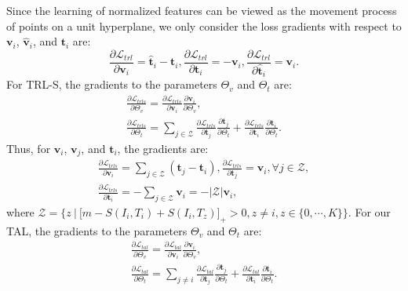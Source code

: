 \documentclass[10pt,twocolumn,letterpaper]{article}
\begin{document}
Since the learning of normalized features can be viewed as the movement process of points on a unit hyperplane, we only consider the loss gradients with respect to $\boldsymbol{v}_i$, $\hat{\boldsymbol{v}}_i$, and $\boldsymbol{t }_i$ are:
\begin{equation}                              
     \frac{\partial \mathcal{L}_{trl}}{\partial\boldsymbol{v}_i} = \hat{\boldsymbol{t}}_i-\boldsymbol{t}_i,  \frac{\partial \mathcal{L}_{trl}}{\partial{\boldsymbol{t}}_i} = - \boldsymbol{v}_i,  \frac{\partial \mathcal{L}_{trl}}{\partial\hat{\boldsymbol{t}}_i} = \boldsymbol{v}_i.
\label{eq_g_trl} 
\end{equation}
For TRL-S, the gradients to the parameters $\Theta_v$ and $\Theta_t$ are:
\begin{equation}
    \begin{gathered}
        \frac{\partial\mathcal{L}_{trls}}{\partial\Theta_v}=\frac{\partial\mathcal{L}_{trls}}{\partial\boldsymbol{v}_i}\frac{\partial\boldsymbol{v}_i}{\partial\Theta_v},\\
        \frac{\partial\mathcal{L}_{trls}}{\partial\Theta_t}=\sum_{j\in \mathcal{Z}}\frac{\partial\mathcal{L}_{trls}}{\partial{\boldsymbol{t}}_j}\frac{\partial{\boldsymbol{t}}_j}{\partial\Theta_t}+\frac{\partial\mathcal{L}_{trls}}{\partial{\boldsymbol{t}}_i}\frac{\partial{\boldsymbol{t}}_i}{\partial\Theta_t}.
    \end{gathered}
\end{equation}
Thus, for $\boldsymbol{v}_i$, ${\boldsymbol{v}}_j$, and $\boldsymbol{t }_i$, the gradients are:
\begin{equation}              
  \begin{gathered}
       \frac{\partial \mathcal{L}_{trls}}{\partial\boldsymbol{v}_i} = \sum^{}_{j\in\mathcal{Z}}({\boldsymbol{t}}_j-\boldsymbol{t}_i),   \frac{\partial \mathcal{L}_{trls}}{\partial{\boldsymbol{t}}_j} = \boldsymbol{v}_i, \forall j\in \mathcal{Z},\\ \frac{\partial \mathcal{L}_{trls}}{\partial{\boldsymbol{t}}_i} = - \sum_{j\in\mathcal{Z}}\boldsymbol{v}_i = -|\mathcal{Z}|\boldsymbol{v}_i, 
  \end{gathered}
\label{eq_g_trls} 
\end{equation}
where $\mathcal{Z}=\{z\ |\ \big[m-S(I_i,T_i)+S(I_i,T_z)\big]_+>0, z\neq i, z\in\{0,\cdots,K\} \}$. For our TAL, the gradients to the parameters $\Theta_v$ and $\Theta_t$ are:
\begin{equation}
    \begin{gathered}
        \frac{\partial\mathcal{L}_{tal}}{\partial\Theta_v}=\frac{\partial\mathcal{L}_{tal}}{\partial\boldsymbol{v}_i}\frac{\partial\boldsymbol{v}_i}{\partial\Theta_v},\\
        \frac{\partial\mathcal{L}_{tal}}{\partial\Theta_t}=\sum_{j\neq i}\frac{\partial\mathcal{L}_{tal}}{\partial{\boldsymbol{t}}_j}\frac{\partial{\boldsymbol{t}}_j}{\partial\Theta_t}+\frac{\partial\mathcal{L}_{tal}}{\partial{\boldsymbol{t}}_i}\frac{\partial{\boldsymbol{t}}_i}{\partial\Theta_t}.
    \end{gathered}
\end{equation}
\end{document}
